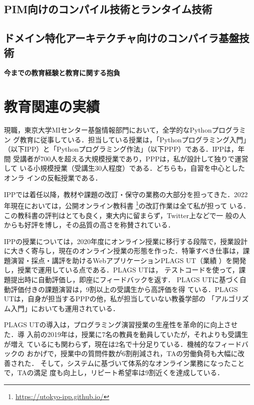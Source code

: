 \documentclass[dvipdfmx]{jsarticle}
\begin{document}
\subsection*{PIM向けのコンパイル技術とランタイム技術}

\subsection*{ドメイン特化アーキテクチャ向けのコンパイラ基盤技術}


\newpage
\begin{center}
\LARGE\bfseries 今までの教育経験と教育に関する抱負
\end{center}
\bigskip

\section*{教育関連の実績}

現職，東京大学MIセンター基盤情報部門において，全学的なPythonプログラミン
グ教育に従事している．担当している授業は，「Pythonプログラミング入門」
（以下IPP）と「Pythonプログラミング作法」（以下PPP）である．IPPは，年間
受講者が700人を超える大規模授業であり，PPPは，私が設計して独りで運営して
いる小規模授業（受講生30人程度）である．どちらも，自習を中心としたオンラ
インの反転授業である．

IPPでは着任以降，教材や課題の改訂・保守の業務の大部分を担ってきた．2022
年現在においては，公開オンライン教科書
\footnote{\url{https://utokyo-ipp.github.io/}}の改訂作業は全て私が担って
いる．この教科書の評判はとても良く，東大内に留まらず，Twitter上などで一
般の人からも好評を博し，その品質の高さを称賛されている．

IPPの授業については，2020年度にオンライン授業に移行する段階で，授業設計
に大きく寄与し，現在のオンライン授業の形態を作った．特筆すべき仕事は，課
題演習・採点・講評を助けるWebアプリケーションPLAGS UT（業績
\cite{ppl22:plags}）を開発し，授業で運用している点である．PLAGS UTは，
テストコードを使って，課題提出時に自動評価し，即座にフィードバックを返す．
PLAGS UTに基づく自動評価付きの課題演習は，9割以上の受講生から高評価を得
ている．PLAGS UTは，自身が担当するPPPの他，私が担当していない教養学部の
「アルゴリズム入門」においても運用されている．

PLAGS UTの導入は，プログラミング演習授業の生産性を革命的に向上させた．導
入前の2019年は，授業に7名の教員を動員していたが，それよりも受講生が増え
ているにも関わらず，現在は2名で十分足りている．機械的なフィードバックの
おかげで，授業中の質問件数が6割削減され，TAの労働負荷も大幅に改善された．
そして，システムに基づいて体系的なオンライン業務になったことで，TAの満足
度も向上し，リピート希望率は9割近くを達成している．
\end{document}
